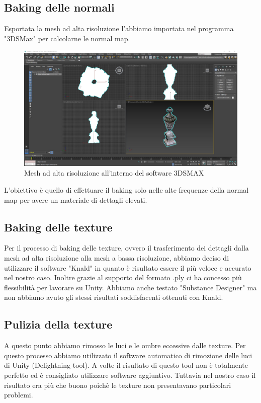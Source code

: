 \documentclass[12pt]{report}
\begin{document}
\subsection{Baking delle normali}
Esportata la mesh ad alta risoluzione l'abbiamo importata nel programma "3DSMax" per calcolarne le normal map.
\begin{figure}[H]
    \centering
    \includegraphics[width = \linewidth]{img/3DSMAX.jpg}
    \caption{Mesh ad alta risoluzione all'interno del software 3DSMAX}
\end{figure}

L'obiettivo \`e quello di effettuare il baking solo nelle alte frequenze della normal map per avere un materiale di dettagli elevati.

\subsection{Baking delle texture}
Per il processo di baking delle texture, ovvero il trasferimento dei dettagli dalla mesh ad alta risoluzione alla mesh a bassa risoluzione, abbiamo deciso di utilizzare il software "Knald" in quanto \`e risultato essere il pi\`u veloce e accurato nel nostro caso. Inoltre grazie al supporto del formato .ply ci ha concesso pi\`u flessibilit\`a per lavorare su Unity.
Abbiamo anche testato "Substance Designer" ma non abbiamo avuto gli stessi risultati soddisfacenti ottenuti con Knald.

\subsection{Pulizia della texture}
A questo punto abbiamo rimosso le luci e le ombre eccessive dalle texture. Per questo processo abbiamo utilizzato il software automatico di rimozione delle luci di Unity (Delightning tool). A volte il risultato di questo tool non è totalmente perfetto ed è consigliato utilizzare software aggiuntivo. Tuttavia nel nostro caso il risultato era più che buono poichè le texture non presentavano particolari problemi.
\end{document}
